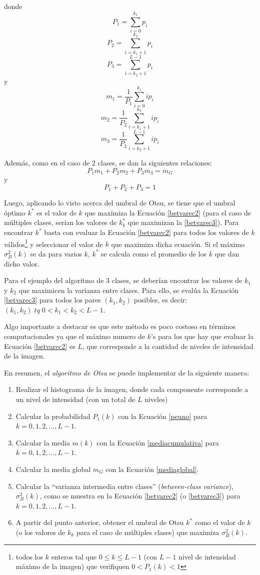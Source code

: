 donde $$P_1=\sum_{i=0}^{k_1}p_i$$ $$P_2=\sum_{i=k_1+1}^{k_2}p_i$$  $$P_3=\sum_{i=k_2+1}^{L-1}p_i$$ y $$m_1 = \frac{1}{P_1}\sum_{i=0}^{k_1}ip_i$$  $$m_2 = \frac{1}{P_2}\sum_{i=k_1+1}^{k_2}ip_i$$  $$m_3 = \frac{1}{P_3}\sum_{i=k_2+1}^{L-1}ip_i$$

Además, como en el caso de 2 clases, se dan la siguientes relaciones:
\begin{equation}
  P_1m_1 + P_2m_2 + P_3m_3 = m_G
\end{equation}
y
\begin{equation}
  P_1+P_2+P_3 = 1
\end{equation}

Luego, aplicando lo visto acerca del umbral de Otsu, se tiene que el umbral óptimo $k^*$ es el valor de $k$ que maximiza la Ecuación \ref{betvarec2} (para el caso de múltiples clases, serían los valores de $k_k^*$ que maximizan la \ref{betvarec3}). Para encontrar $k^*$ basta con evaluar la Ecuación \ref{betvarec2} para todos los valores de $k$ válidos\footnote{ todos los $k$ enteros tal que $0{\leq}k{\leq}L-1$ (con $L-1$ nivel de intensidad máximo de la imagen) que verifiquen $0<P_1(k)<1$ } y seleccionar el valor de $k$ que maximiza dicha ecuación. Si el máximo ${\sigma}_B^2(k)$ se da para varios $k$, $k^*$ se calcula como el promedio de los $k$ que dan dicho valor.

Para el ejemplo del algoritmo de 3 clases, se deberían encontrar los valores de $k_1$ y $k_2$ que maximicen la varianza entre clases. Para ello, se evalúa la Ecuación \ref{betvarec3} para todos los pares $(k_1,k_2)$ posibles, es decir: $(k_1,k_2) \; tq \; 0<k_1<k_2<L-1$.

Algo importante a destacar es que este método es poco costoso en términos computacionales ya que el máximo numero de $k$'s para los que hay que evaluar la Ecuación \ref{betvarec2} es $L$, que corresponde a la cantidad de niveles de intensidad de la imagen.

En resumen, el \textit{algoritmo de Otsu} se puede implementar de la siguiente manera:
\begin{enumerate}
 \item Realizar el histograma de la imagen, donde cada componente corresponde a un nivel de intensidad (con un total de $L$ niveles)
 \item Calcular la probabilidad $P_1(k)$ con la Ecuación \ref{peuno} para $k=0,1,2,...,L-1$.
 \item Calcular la media $m(k)$ con la Ecuación \ref{mediacumulativa} para $k=0,1,2,...,L-1$.
 \item Calcular la media global $m_G$ con la Ecuación \ref{mediaglobal}.
 \item Calcular la ``varianza intermedia entre clases'' (\textit{between-class variance}), ${\sigma}_B^2(k)$, como se muestra en la Ecuación \ref{betvarec2} (o \ref{betvarec3})  para $k=0,1,2,...,L-1$.
 \item A partir del punto anterior, obtener el umbral de Otsu $k^*$ como el valor de $k$ (o los valores de $k_k$ para el caso de múltiples clases) que maximiza ${\sigma}_B^2(k)$.
\end{enumerate}

